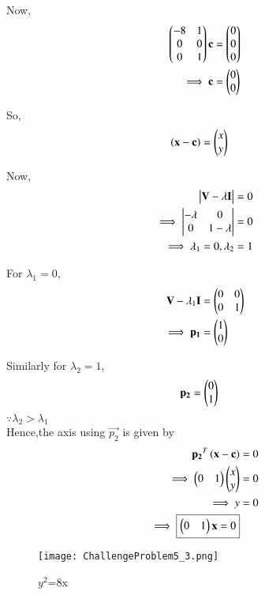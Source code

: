 \documentclass[journal,12pt,twocolumn]{IEEEtran}
\begin{document}
\begin{enumerate}
    Now,
    \begin{align}
    \begin{pmatrix}-8 & 1 \\ 0 & 0 \\ 0 & 1\end{pmatrix}\mathbf{c} &= \begin{pmatrix}0 \\ 0 \\ 0\end{pmatrix}
    \\
    \implies \mathbf{c} &= \begin{pmatrix}0 \\ 0\end{pmatrix}
    \end{align}
    
    So,
    \begin{align}
    \left(\mathbf{x}-\mathbf{c}\right) &= \begin{pmatrix}x \\ y\end{pmatrix}
    \end{align}
    
    Now,
    \begin{align}
        \begin{vmatrix}\mathbf{V}-\lambda\mathbf{I}\end{vmatrix} &= 0 \\
        \implies \begin{vmatrix}-\lambda & 0 \\ 0 & 1-\lambda\end{vmatrix} &= 0 \\
        \implies \lambda_1 =0,\lambda_2 &= 1
    \end{align}
    
    For $\lambda_1=0$,
    \begin{align}
        \mathbf{V}-\lambda_1\mathbf{I} &= \begin{pmatrix}0 & 0 \\ 0 & 1\end{pmatrix} \\
        \implies \mathbf{p_1} &= \begin{pmatrix}1 \\ 0\end{pmatrix}
    \end{align}
    
    Similarly for $\lambda_2=1$,
    \begin{align}
        \mathbf{p_2} &=\begin{pmatrix}0 \\ 1\end{pmatrix}
    \end{align}
    $\because \lambda_2>\lambda_1$ \\
    Hence,the axis using $\vec{p_2}$ is given by
    \begin{align}
        \mathbf{p_2}^T\left(\mathbf{x}-\mathbf{c}\right) &= 0 \\
        \implies \begin{pmatrix}0 & 1\end{pmatrix}\begin{pmatrix}x \\ y\end{pmatrix} &= 0 \\
        \implies y &= 0\\
        \implies \boxed{\begin{pmatrix}0 & 1\end{pmatrix}\mathbf{x} =0}
    \end{align}
    
    \begin{figure}[!ht]
    \centering
    \texttt{[image: ChallengeProblem5\_3.png]}
    \caption{$y^2$=8x}
    \label{ex3}	
    \end{figure}
    

\end{enumerate}
\end{document}
